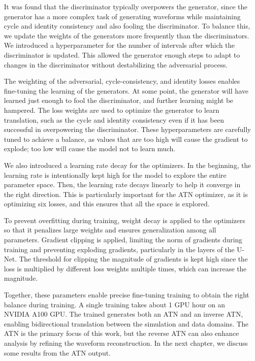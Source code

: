 

It was found that the discriminator typically overpowers the generator, since the generator has a more complex task of generating waveforms while maintaining cycle and identity consistency and also fooling the discriminator. To balance this, we update the weights of the generators more frequently than the discriminators. We introduced a hyperparameter for the number of intervals after which the discriminator is updated. This allowed the generator enough steps to adapt to changes in the discriminator without destabilizing the adversarial process.

The weighting of the adversarial, cycle-consistency, and identity losses enables fine-tuning the learning of the generators. At some point, the generator will have learned just enough to fool the discriminator, and further learning might be hampered. The loss weights are used to optimize the generator to learn translation, such as the cycle and identity consistency even if it has been successful in overpowering the discriminator. These hyperparameters are carefully tuned to achieve a balance, as values that are too high will cause the gradient to explode; too low will cause the model not to learn much. 

We also introduced a learning rate decay for the optimizers. In the beginning, the learning rate is intentionally kept high for the model to explore the entire parameter space. Then, the learning rate decays linearly to help it converge in the right direction. This is particularly important for the ATN optimizer, as it is optimizing six losses, and this ensures that all the space is explored.

To prevent overfitting during training, weight decay is applied to the optimizers so that it penalizes large weights and ensures generalization among all parameters. Gradient clipping is applied, limiting the norm of gradients during training and preventing exploding gradients, particularly in the layers of the U-Net. The threshold for clipping the magnitude of gradients is kept high since the loss is multiplied by different loss weights multiple times, which can increase the magnitude.

Together, these parameters enable precise fine-tuning {\cpunet} training to obtain the right balance during training. A single training takes about 1 GPU hour on an NVIDIA A100 GPU. The trained {\cpunet} generates both an ATN and an inverse ATN, enabling bidirectional translation between the simulation and data domains. The ATN is the primary focus of this work, but the reverse ATN can also enhance analysis by refining the waveform reconstruction. In the next chapter, we discuss some results from the ATN output.